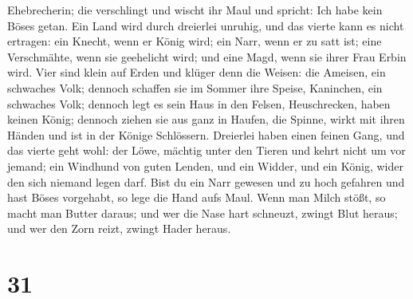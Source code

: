 Ehebrecherin; die verschlingt und wischt ihr Maul und spricht: Ich habe
kein Böses getan.  Ein Land wird durch dreierlei unruhig,
und das vierte kann es nicht ertragen:  ein Knecht, wenn er
König wird; ein Narr, wenn er zu satt ist;  eine
Verschmähte, wenn sie geehelicht wird; und eine Magd, wenn sie ihrer
Frau Erbin wird.  Vier sind klein auf Erden und klüger denn
die Weisen:  die Ameisen, ein schwaches Volk; dennoch
schaffen sie im Sommer ihre Speise,  Kaninchen, ein
schwaches Volk; dennoch legt es sein Haus in den Felsen, 
Heuschrecken, haben keinen König; dennoch ziehen sie aus ganz in Haufen,
 die Spinne, wirkt mit ihren Händen und ist in der Könige
Schlössern.  Dreierlei haben einen feinen Gang, und das
vierte geht wohl:  der Löwe, mächtig unter den Tieren und
kehrt nicht um vor jemand;  ein Windhund von guten Lenden,
und ein Widder, und ein König, wider den sich niemand legen darf.
 Bist du ein Narr gewesen und zu hoch gefahren und hast
Böses vorgehabt, so lege die Hand aufs Maul.  Wenn man
Milch stößt, so macht man Butter daraus; und wer die Nase hart schneuzt,
zwingt Blut heraus; und wer den Zorn reizt, zwingt Hader heraus.

\hypertarget{section-30}{%
\section{31}\label{section-30}}

